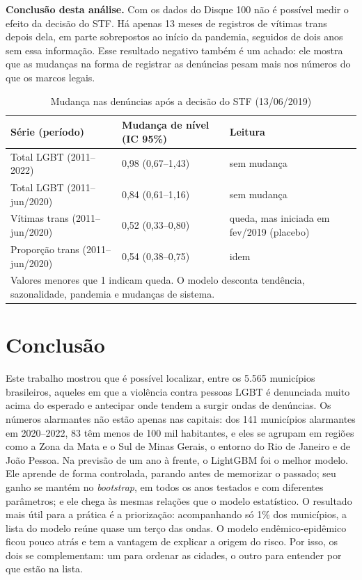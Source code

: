 \documentclass[12pt]{article}
\begin{document}
\textbf{Conclusão desta análise.} Com os dados do Disque 100 não é possível medir o efeito da decisão do STF. Há apenas 13 meses de registros de vítimas trans depois dela, em parte sobrepostos ao início da pandemia, seguidos de dois anos sem essa informação. Esse resultado negativo também é um achado: ele mostra que as mudanças na forma de registrar as denúncias pesam mais nos números do que os marcos legais.

\begin{table}[H]
\centering
\caption{Mudança nas denúncias após a decisão do STF (13/06/2019)}
\label{tab:its}
{\renewcommand{\arraystretch}{1.25}\small
\begin{tabular}{p{4.4cm} p{3.4cm} p{4.6cm}}
\hline
\textbf{Série (período)} & \textbf{Mudança de nível (IC 95\%)} & \textbf{Leitura} \\
\hline
Total LGBT (2011--2022) & 0,98 (0,67--1,43) & sem mudança \\
Total LGBT (2011--jun/2020) & 0,84 (0,61--1,16) & sem mudança \\
Vítimas trans (2011--jun/2020) & 0,52 (0,33--0,80) & queda, mas iniciada em fev/2019 (placebo) \\
Proporção trans (2011--jun/2020) & 0,54 (0,38--0,75) & idem \\
\hline
\multicolumn{3}{p{12.4cm}}{\footnotesize Valores menores que 1 indicam queda. O modelo desconta tendência, sazonalidade, pandemia e mudanças de sistema.}
\end{tabular}}
\end{table}


\section{Conclusão}

Este trabalho mostrou que é possível localizar, entre os 5.565 municípios brasileiros, aqueles em que a violência contra pessoas LGBT é denunciada muito acima do esperado e antecipar onde tendem a surgir ondas de denúncias. Os números alarmantes não estão apenas nas capitais: dos 141 municípios alarmantes em 2020--2022, 83 têm menos de 100 mil habitantes, e eles se agrupam em regiões como a Zona da Mata e o Sul de Minas Gerais, o entorno do Rio de Janeiro e de João Pessoa. Na previsão de um ano à frente, o LightGBM foi o melhor modelo. Ele aprende de forma controlada, parando antes de memorizar o passado; seu ganho se mantém no \textit{bootstrap}, em todos os anos testados e com diferentes parâmetros; e ele chega às mesmas relações que o modelo estatístico. O resultado mais útil para a prática é a priorização: acompanhando só 1\% dos municípios, a lista do modelo reúne quase um terço das ondas. O modelo endêmico-epidêmico ficou pouco atrás e tem a vantagem de explicar a origem do risco. Por isso, os dois se complementam: um para ordenar as cidades, o outro para entender por que estão na lista.
\end{document}
